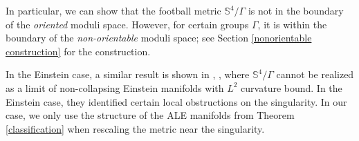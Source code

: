 \documentclass[12pt]{amsart}
\newtheorem{corollary}[theorem]{Corollary}
\theoremstyle{definition}
\begin{document}
In particular, we can show that the football metric $\mathbb{S}^4/\Gamma$ is not in the boundary of the \textit{oriented} moduli space. However, for certain groups $\Gamma$, it is within the boundary of the \textit{non-orientable} moduli space; see Section \ref{nonorientable construction} for the construction. 

In the Einstein case, a similar result is shown in \cite{biquard}, \cite{ozuch2022noncollapsed}, where $\mathbb{S}^4/\Gamma$ cannot be realized as a limit of non-collapsing Einstein manifolds with $L^2$ curvature bound. In the Einstein case, they identified certain local obstructions on the singularity. In our case, we only use the structure of the ALE manifolds from Theorem \ref{classification} when rescaling the metric near the singularity.


 










\end{document}
